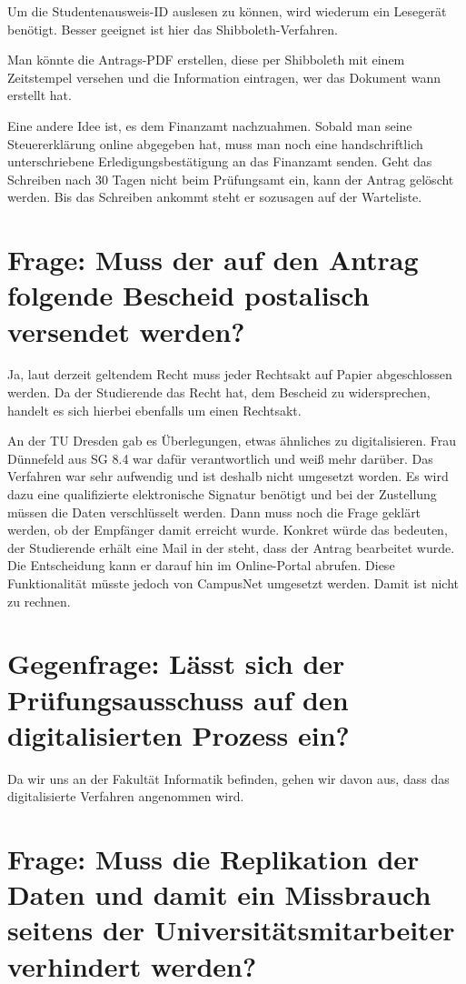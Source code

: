 \documentclass[ngerman]{tudscrreprt}
\begin{document}
Um die Studentenausweis-ID auslesen zu können, wird wiederum ein Lesegerät benötigt.
Besser geeignet ist hier das Shibboleth-Verfahren.

Man könnte die Antrags-PDF erstellen, diese per Shibboleth mit einem Zeitstempel versehen und die Information eintragen, wer das Dokument wann erstellt hat.

Eine andere Idee ist, es dem Finanzamt nachzuahmen. Sobald man seine Steuererklärung online abgegeben hat, muss man noch eine handschriftlich unterschriebene Erledigungsbestätigung an das Finanzamt senden. Geht das Schreiben nach 30 Tagen nicht beim Prüfungsamt ein, kann der Antrag gelöscht werden. Bis das Schreiben ankommt steht er sozusagen auf der Warteliste.

\section{Frage: Muss der auf den Antrag folgende Bescheid postalisch versendet werden?}

Ja, laut derzeit geltendem Recht muss jeder Rechtsakt auf Papier abgeschlossen werden. Da der Studierende das Recht hat, dem Bescheid zu widersprechen, handelt es sich hierbei ebenfalls um einen Rechtsakt.

An der TU Dresden gab es Überlegungen, etwas ähnliches zu digitalisieren. Frau Dünnefeld aus SG 8.4 war dafür verantwortlich und weiß mehr darüber. Das Verfahren war sehr aufwendig und ist deshalb nicht umgesetzt worden. Es wird dazu eine qualifizierte elektronische Signatur benötigt und bei der Zustellung müssen die Daten verschlüsselt werden. Dann muss noch die Frage geklärt werden, ob der Empfänger damit erreicht wurde. Konkret würde das bedeuten, der Studierende erhält eine Mail in der steht, dass der Antrag bearbeitet wurde. Die Entscheidung kann er darauf hin im Online-Portal abrufen. Diese Funktionalität müsste jedoch von CampusNet umgesetzt werden. Damit ist nicht zu rechnen.

\section{Gegenfrage: Lässt sich der Prüfungsausschuss auf den digitalisierten Prozess ein?}

Da wir uns an der Fakultät Informatik befinden, gehen wir davon aus, dass das digitalisierte Verfahren angenommen wird.

\section{Frage: Muss die Replikation der Daten und damit ein Missbrauch seitens der Universitätsmitarbeiter verhindert werden?}
\end{document}
